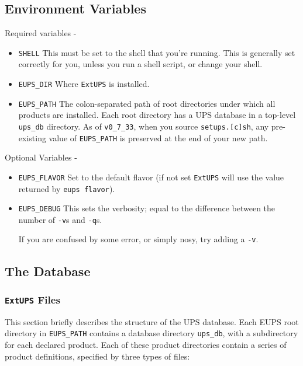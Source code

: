 \documentclass{article}
\newcommand{\code}[1]{\texttt{#1}}
\newcommand{\eups}{\code{ExtUPS}}
\begin{document}
\subsection{Environment Variables}

Required variables -

\begin{itemize}
  \item \code{SHELL}
    This must be set to the shell that you're running. This is
    generally set correctly for you, unless you run a shell script, or
    change your shell.

  \item \code{EUPS\_DIR}
    Where \eups{} is installed.

  \item \code{EUPS\_PATH}
    The colon-separated path of root directories under which all products are installed.
    Each root directory has a UPS database in a top-level \code{ups\_db} directory.
    As of \code{v0\_7\_33}, when you source \code{setups.[c]sh}, any
    pre-existing value of \code{EUPS\_PATH} is preserved at the end of
    your new path.
\end{itemize}

Optional Variables -

\begin{itemize}
  \item \code{EUPS\_FLAVOR}
    Set to the default flavor (if not set \eups{} will use the value returned
    by \code{eups flavor}).

  \item \code{EUPS\_DEBUG}
    This sets the verbosity; equal to the difference between the number of \code{-v}s
    and \code{-q}s.

    If you are confused by some error, or simply nosy, try adding a \code{-v}.
\end{itemize}

\subsection{The Database}

\subsubsection{\eups{} Files}

This section briefly describes the structure of the UPS database. Each
EUPS root directory in \code{EUPS\_PATH} contains a database directory
\code{ups\_db}, with a subdirectory for each declared product.  Each
of these product directories contain a series of product definitions,
specified by three types of files:
\end{document}
